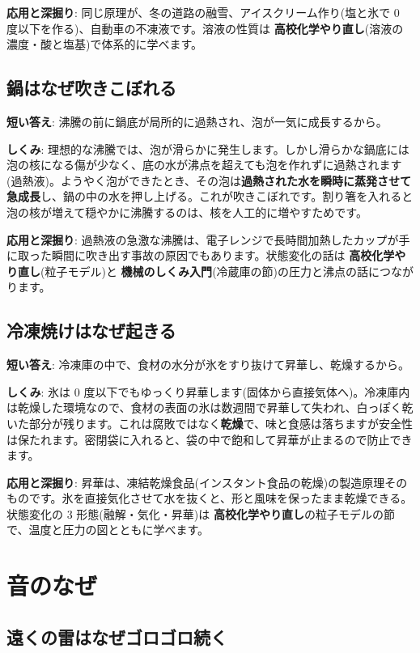 \documentclass{article}
\begin{document}
\textbf{応用と深掘り}: 同じ原理が、冬の道路の融雪、アイスクリーム作り(塩と氷で 0 度以下を作る)、自動車の不凍液です。溶液の性質は \textbf{高校化学やり直し}(溶液の濃度・酸と塩基)で体系的に学べます。

\subsection{鍋はなぜ吹きこぼれる}

\textbf{短い答え}: 沸騰の前に鍋底が局所的に過熱され、泡が一気に成長するから。

\textbf{しくみ}: 理想的な沸騰では、泡が滑らかに発生します。しかし滑らかな鍋底には泡の核になる傷が少なく、底の水が沸点を超えても泡を作れずに過熱されます(過熱液)。ようやく泡ができたとき、その泡は\textbf{過熱された水を瞬時に蒸発させて急成長}し、鍋の中の水を押し上げる。これが吹きこぼれです。割り箸を入れると泡の核が増えて穏やかに沸騰するのは、核を人工的に増やすためです。

\textbf{応用と深掘り}: 過熱液の急激な沸騰は、電子レンジで長時間加熱したカップが手に取った瞬間に吹き出す事故の原因でもあります。状態変化の話は \textbf{高校化学やり直し}(粒子モデル)と \textbf{機械のしくみ入門}(冷蔵庫の節)の圧力と沸点の話につながります。

\subsection{冷凍焼けはなぜ起きる}

\textbf{短い答え}: 冷凍庫の中で、食材の水分が氷をすり抜けて昇華し、乾燥するから。

\textbf{しくみ}: 氷は 0 度以下でもゆっくり昇華します(固体から直接気体へ)。冷凍庫内は乾燥した環境なので、食材の表面の氷は数週間で昇華して失われ、白っぽく乾いた部分が残ります。これは腐敗ではなく\textbf{乾燥}で、味と食感は落ちますが安全性は保たれます。密閉袋に入れると、袋の中で飽和して昇華が止まるので防止できます。

\textbf{応用と深掘り}: 昇華は、凍結乾燥食品(インスタント食品の乾燥)の製造原理そのものです。氷を直接気化させて水を抜くと、形と風味を保ったまま乾燥できる。状態変化の 3 形態(融解・気化・昇華)は \textbf{高校化学やり直し}の粒子モデルの節で、温度と圧力の図とともに学べます。

\section{音のなぜ}

\subsection{遠くの雷はなぜゴロゴロ続く}
\end{document}
